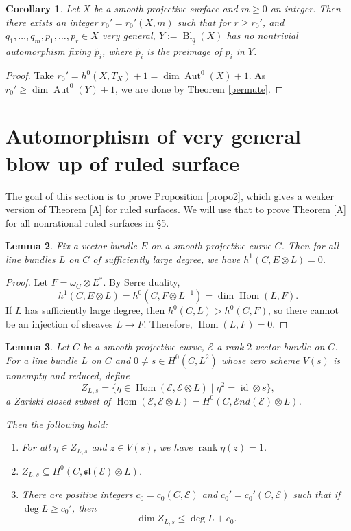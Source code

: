 \documentclass[11pt,letterpaper]{amsart}
\newtheorem{lemma}{Lemma}[section]
\newtheorem{corollary}[lemma]{Corollary}
\begin{document}
\begin{corollary}\label{r'}
Let $X$ be a smooth projective surface and $m\geq 0$ an integer. Then there exists an integer $r_0'=r_0'(X,m)$ such that
for $r\ge r_0'$, and
$q_1,\ldots,q_m,p_1,\ldots,p_r\in X$ very general, $Y:=\operatorname{Bl}_{\underline{q}}(X)$
has no nontrivial automorphism fixing $\widetilde{p_i}$, where $\widetilde{p_i}$ is the preimage of $p_i$ in $Y$.
\end{corollary}
\begin{proof}
    Take $r_0'=h^0(X,T_X)+1=\dim \operatorname{Aut}^0(X)+1$. As $r_0'\geq \dim \operatorname{Aut}^0(Y)+1$, we are done by Theorem \ref{permute}.
\end{proof}
\section{Automorphism of very general blow up of ruled surface}
The goal of this section is to prove Proposition \ref{propo2}, which gives a weaker version of Theorem \ref{A} for ruled surfaces. We will use that to prove Theorem \ref{A} for all nonrational ruled surfaces in \S 5.
\begin{lemma}\label{Serre}
Fix a vector bundle $E$ on a smooth projective curve $C$. Then for all line bundles $L$ on $C$ of sufficiently large degree, we have
$h^1(C,E\otimes L)=0$.
\end{lemma}
\begin{proof}
Let $F=\omega_C\otimes E^*$. By Serre duality,
$$h^1(C,E\otimes L)=h^0(C,F\otimes L^{-1})
=\dim\operatorname{Hom}(L,F).$$
If $L$ has sufficiently large degree, then $h^0(C,L)>h^0(C,F)$, so there cannot be an injection of sheaves $L\to F$. Therefore,
$\operatorname{Hom}(L,F)=0$.
\end{proof}
\begin{lemma}\label{zls}
Let $C$ be a smooth projective curve, $\mathcal{E}$ a rank $2$ vector bundle on $C$. For a line bundle $L$ on $C$ and $0\neq s\in H^0(C,L^2)$ whose zero scheme $V(s)$ is nonempty and reduced, define
\[
Z_{L,s}=\{\eta\in\operatorname{Hom}(\mathcal{E},\mathcal{E}\otimes L)\mid \eta^2=\operatorname{id}\otimes s\},
\]
a Zariski closed subset of $\operatorname{Hom}(\mathcal{E},\mathcal{E}\otimes L)=H^0(C,\mathcal{E}nd(\mathcal{E})\otimes L)$.

Then the following hold:

\begin{enumerate}
\item For all $\eta\in Z_{L,s}$ and $z\in V(s)$, we have $\operatorname{rank}\eta(z)=1$.

\item $Z_{L,s}\subseteq H^0(C,\mathfrak{sl}(\mathcal{E})\otimes L)$.

\item There are positive integers $c_0=c_0(C,\mathcal{E})$ and $c_0'=c_0'(C,\mathcal{E})$ such that if $\deg L\ge c_0'$, then
\[
\dim Z_{L,s}\le \deg L+c_0.
\]
\end{enumerate}
\end{lemma}
\end{document}
